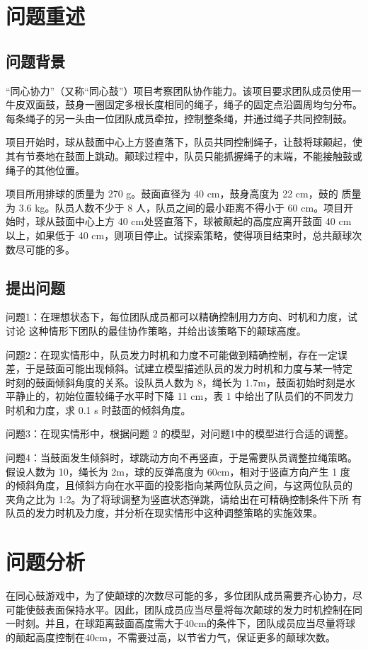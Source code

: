 \documentclass[nocover]{cumcmart}%
\begin{document}
\newpage


\section{问题重述}
\subsection{问题背景}
“同心协力”（又称“同心鼓”）项目考察团队协作能力。该项目要求团队成员使用一牛皮双面鼓，鼓身一圈固定多根长度相同的绳子，绳子的固定点沿圆周均匀分布。每条绳子的另一头由一位团队成员牵拉，控制整条绳，并通过绳子共同控制鼓。

项目开始时，球从鼓面中心上方竖直落下，队员共同控制绳子，让鼓将球颠起，使其有节奏地在鼓面上跳动。颠球过程中，队员只能抓握绳子的末端，不能接触鼓或绳子的其他位置。

项目所用排球的质量为 270 g。鼓面直径为 40 cm，鼓身高度为 22 cm，鼓的
质量为 3.6 kg。队员人数不少于 8 人，队员之间的最小距离不得小于 60 cm。项目开始时，球从鼓面中心上方 40 cm处竖直落下，球被颠起的高度应离开鼓面 40 cm 以上，如果低于 40 cm，则项目停止。试探索策略，使得项目结束时，总共颠球次数尽可能的多。

\subsection{提出问题}
问题1：在理想状态下，每位团队成员都可以精确控制用力方向、时机和力度，试讨论
这种情形下团队的最佳协作策略，并给出该策略下的颠球高度。

问题2：在现实情形中，队员发力时机和力度不可能做到精确控制，存在一定误
差，于是鼓面可能出现倾斜。试建立模型描述队员的发力时机和力度与某一特定
时刻的鼓面倾斜角度的关系。设队员人数为 8，绳长为 1.7m，鼓面初始时刻是水
平静止的，初始位置较绳子水平时下降 11 cm，表 1 中给出了队员们的不同发力
时机和力度，求 0.1 s 时鼓面的倾斜角度。

问题3：在现实情形中，根据问题 2 的模型，对问题1中的模型进行合适的调整。

问题4：当鼓面发生倾斜时，球跳动方向不再竖直，于是需要队员调整拉绳策略。
假设人数为 10，绳长为 2m，球的反弹高度为 60cm，相对于竖直方向产生 1 度
的倾斜角度，且倾斜方向在水平面的投影指向某两位队员之间，与这两位队员的
夹角之比为 1:2。为了将球调整为竖直状态弹跳，请给出在可精确控制条件下所
有队员的发力时机及力度，并分析在现实情形中这种调整策略的实施效果。

\section{问题分析}
在同心鼓游戏中，为了使颠球的次数尽可能的多，多位团队成员需要齐心协力，尽可能使鼓表面保持水平。因此，团队成员应当尽量将每次颠球的发力时机控制在同一时刻。并且，在球距离鼓面高度需大于40cm的条件下，团队成员应当尽量将球的颠起高度控制在40cm，不需要过高，以节省力气，保证更多的颠球次数。
\end{document}
